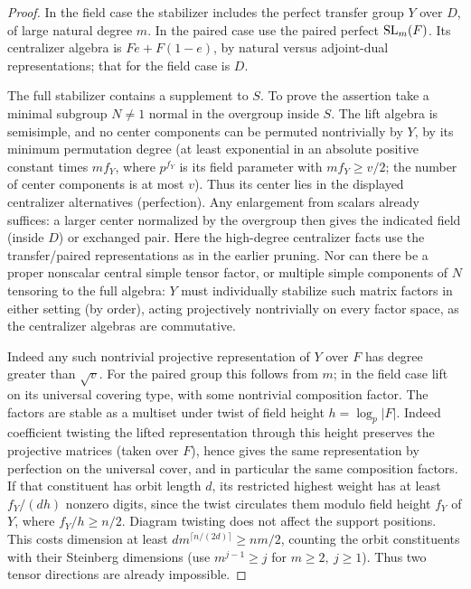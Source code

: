 \begin{proof}

In the field case the stabilizer includes the perfect transfer group \(Y\) over \(D\), of large natural degree \(m\). In the paired case use the paired perfect \({\rm SL}_m(F)\). Its centralizer algebra is \(Fe+F(1-e)\), by natural versus adjoint-dual representations; that for the field case is \(D\).

The full stabilizer contains a supplement to \(S\). To prove the assertion take a minimal subgroup \(N\ne1\) normal in the overgroup inside \(S\). The lift algebra is semisimple, and no center components can be permuted nontrivially by \(Y\), by its minimum permutation degree (at least exponential in an absolute positive constant times \(m f_Y\), where \(p^{f_Y}\) is its field parameter with \(m f_Y\ge v/2\); the number of center components is at most \(v\)). Thus its center lies in the displayed centralizer alternatives (perfection). Any enlargement from scalars already suffices: a larger center normalized by the overgroup then gives the indicated field (inside \(D\)) or exchanged pair. Here the high-degree centralizer facts use the transfer/paired representations as in the earlier pruning. Nor can there be a proper nonscalar central simple tensor factor, or multiple simple components of \(N\) tensoring to the full algebra: \(Y\) must individually stabilize such matrix factors in either setting (by order), acting projectively nontrivially on every factor space, as the centralizer algebras are commutative.

Indeed any such nontrivial projective representation of \(Y\) over \(F\) has degree greater than \(\sqrt v\). For the paired group this follows from \(m\); in the field case lift on its universal covering type, with some nontrivial composition factor. The factors are stable as a multiset under twist of field height \(h=\log_p |F|\). Indeed coefficient twisting the lifted representation through this height preserves the projective matrices (taken over \(F\)), hence gives the same representation by perfection on the universal cover, and in particular the same composition factors. If that constituent has orbit length \(d\), its restricted highest weight has at least \(f_Y/(d h)\) nonzero digits, since the twist circulates them modulo field height \(f_Y\) of \(Y\), where \(f_Y/h\ge n/2\). Diagram twisting does not affect the support positions. This costs dimension at least \(d m^{\lceil n/(2d)\rceil}\ge nm/2\), counting the orbit constituents with their Steinberg dimensions (use \(m^{j-1}\ge j\) for \(m\ge2,\ j\ge1\)). Thus two tensor directions are already impossible.


\end{proof}
